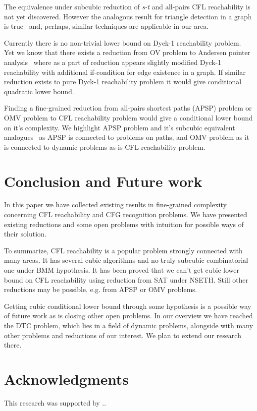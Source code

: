 \documentclass[acmsmall,review,nonacm]{acmart}\settopmatter{printfolios=true,printccs=false,printacmref=false}
\begin{document}
	The equivalence under subcubic reduction of \emph{s-t} and 
	all-pairs CFL reachability is not yet discovered. However the analogous result for triangle detection in a graph is true~\cite{10.1145/3186893} and, perhaps, similar techniques are applicable in our area. 
	
	Currently there is no non-trivial lower bound on Dyck-1 reachability problem. 
	Yet we know that there exists a reduction from OV problem to Andersen pointer analysis~\cite{10.1145/3434315} where as a part of reduction appears slightly modified Dyck-1 reachability with additional if-condition for edge existence in a graph. If similar reduction exists to pure Dyck-1 reachability problem it would give conditional quadratic lower bound. 
	
	Finding a fine-grained reduction from all-pairs shortest paths (APSP) problem or OMV problem to CFL reachability problem would give a conditional lower bound on it's complexity. We highlight APSP problem and it's subcubic equivalent analogues~\cite{10.1145/3186893} as APSP is connected to problems on paths, and OMV problem as it is connected to dynamic problems as is CFL reachability problem. 
	
	\section{Conclusion and Future work}
	
	In this paper we have collected existing results in fine-grained complexity concerning CFL reachability and CFG recognition problems. We have presented existing reductions and some open problems with intuition for possible ways of their solution. 
	
	To summarize, CFL reachability is a popular problem strongly connected with many areas. It has several cubic algorithms and no truly subcubic combinatorial one under BMM hypothesis. It has been proved that we can't get cubic lower bound on CFL reachability using reduction from SAT under NSETH. Still other reductions may be possible, e.g. from APSP or OMV problems. 
	
	Getting cubic conditional lower bound through some hypothesis is a possible way of future work as is closing other open problems. In our overview we have reached the DTC problem, which lies in a field of dynamic problems, alongside with many other problems and reductions of our interest. We plan to extend our research there. 
	
	\section{Acknowledgments}
	
	This research was supported by ..
	
	
	
	
	\appendix
	
\end{document}
